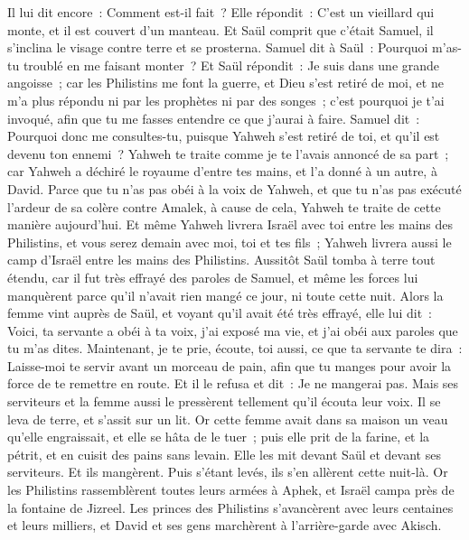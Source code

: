\begin{multicols}{2}
Il lui dit encore~: Comment est-il fait~? Elle répondit~: C'est un vieillard qui monte, et il est couvert d'un manteau. Et Saül comprit que c'était Samuel, il s'inclina le visage contre terre et se prosterna.
Samuel dit à Saül~: Pourquoi m'as-tu troublé en me faisant monter~? Et Saül répondit~: Je suis dans une grande angoisse~; car les Philistins me font la guerre, et Dieu s'est retiré de moi, et ne m'a plus répondu ni par les prophètes ni par des songes~; c'est pourquoi je t'ai invoqué, afin que tu me fasses entendre ce que j'aurai à faire.
Samuel dit~: Pourquoi donc me consultes-tu, puisque Yahweh s'est retiré de toi, et qu'il est devenu ton ennemi~?
Yahweh te traite comme je te l'avais annoncé de sa part~; car Yahweh a déchiré le royaume d'entre tes mains, et l'a donné à un autre, à David.
Parce que tu n'as pas obéi à la voix de Yahweh, et que tu n'as pas exécuté l'ardeur de sa colère contre Amalek, à cause de cela, Yahweh te traite de cette manière aujourd'hui.
Et même Yahweh livrera Israël avec toi entre les mains des Philistins, et vous serez demain avec moi, toi et tes fils~; Yahweh livrera aussi le camp d'Israël entre les mains des Philistins.
Aussitôt Saül tomba à terre tout étendu, car il fut très effrayé des paroles de Samuel, et même les forces lui manquèrent parce qu'il n'avait rien mangé ce jour, ni toute cette nuit.
Alors la femme vint auprès de Saül, et voyant qu'il avait été très effrayé, elle lui dit~: Voici, ta servante a obéi à ta voix, j'ai exposé ma vie, et j'ai obéi aux paroles que tu m'as dites.
Maintenant, je te prie, écoute, toi aussi, ce que ta servante te dira~: Laisse-moi te servir avant un morceau de pain, afin que tu manges pour avoir la force de te remettre en route.
Et il le refusa et dit~: Je ne mangerai pas. Mais ses serviteurs et la femme aussi le pressèrent tellement qu'il écouta leur voix. Il se leva de terre, et s'assit sur un lit.
Or cette femme avait dans sa maison un veau qu'elle engraissait, et elle se hâta de le tuer~; puis elle prit de la farine, et la pétrit, et en cuisit des pains sans levain.
Elle les mit devant Saül et devant ses serviteurs. Et ils mangèrent. Puis s'étant levés, ils s'en allèrent cette nuit-là.
\VerseOne{}Or les Philistins rassemblèrent toutes leurs armées à Aphek, et Israël campa près de la fontaine de Jizreel.
Les princes des Philistins s'avancèrent avec leurs centaines et leurs milliers, et David et ses gens marchèrent à l'arrière-garde avec Akisch.

\end{multicols}

